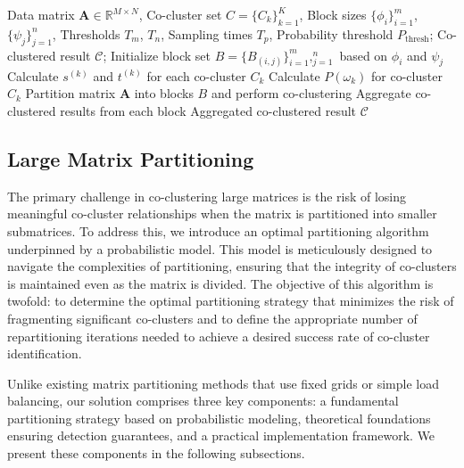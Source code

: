 \documentclass[journal]{IEEEtran}
\theoremstyle{definition}
\theoremstyle{remark} %
\begin{document}
\begin{algorithm}[!t]
    \caption{Optimal Matrix Partition and Hierarchical Co-cluster Merging Method}
    \begin{algorithmic}[1]
        \REQUIRE Data matrix $\mathbf{A} \in \mathbb{R}^{M \times N}$, Co-cluster set $C = \{C_k\}_{k=1}^K$, Block sizes $\{\phi_i\}_{i=1}^m$, $\{\psi_j\}_{j=1}^n$, Thresholds $T_m$, $T_n$, Sampling times $T_p$, Probability threshold $P_\text{thresh}$;
        \ENSURE Co-clustered result $\mathcal{C}$;
        \STATE Initialize block set $B = \{B_{(i,j)}\}_{i=1}^m,_{j=1}^n$ based on $\phi_i$ and $\psi_j$
        \STATE Calculate $s^{(k)}$ and $t^{(k)}$ for each co-cluster $C_k$
        \STATE Calculate $P(\omega_k)$ for co-cluster $C_k$
        \STATE Partition matrix $\mathbf{A}$ into blocks $B$ and perform co-clustering
        \STATE Aggregate co-clustered results from each block
        \ENDIF
        \ENDFOR
        \RETURN Aggregated co-clustered result $\mathcal{C}$
    \end{algorithmic}
    \label{alg:method}
\end{algorithm}


\subsection{Large Matrix Partitioning}
\label{subsec:large-matrix-partitioning}
The primary challenge in co-clustering large matrices is the risk of losing meaningful co-cluster relationships when the matrix is partitioned into smaller submatrices. To address this, we introduce an optimal partitioning algorithm underpinned by a probabilistic model. This model is meticulously designed to navigate the complexities of partitioning, ensuring that the integrity of co-clusters is maintained even as the matrix is divided. The objective of this algorithm is twofold: to determine the optimal partitioning strategy that minimizes the risk of fragmenting significant co-clusters and to define the appropriate number of repartitioning iterations needed to achieve a desired success rate of co-cluster identification.

    {\color{blue}Unlike existing matrix partitioning methods that use fixed grids or simple load balancing,  our solution comprises three key components: a fundamental partitioning strategy based on probabilistic modeling, theoretical foundations ensuring detection guarantees, and a practical implementation framework. We present these components in the following subsections.
    }
\end{document}
